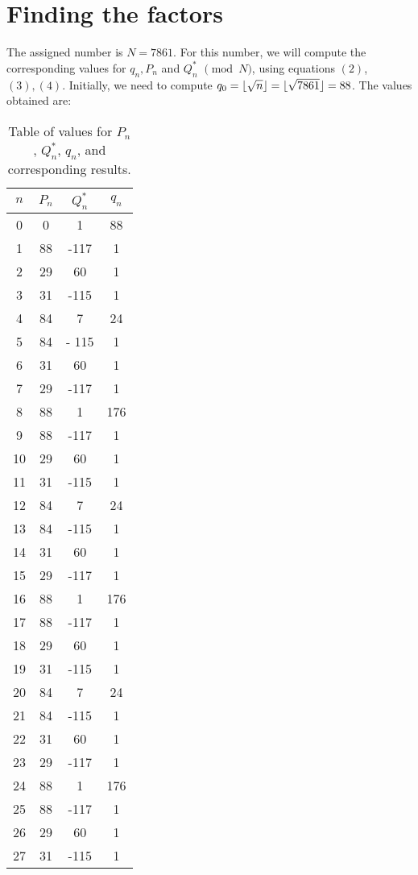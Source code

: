 \documentclass[12pt]{article}
\DeclarePairedDelimiter\floor{\lfloor}{\rfloor}
\theoremstyle{definition}
\begin{document}
\section{Finding the factors}
The assigned number is $N=7861$. For this number, we will compute the corresponding values for $q_n, P_n$ and $Q_n^*$ $\pmod N$, using equations $(2)$, $(3), (4)$. Initially, we need to compute $q_0 = \floor{\sqrt{n}} = \floor{\sqrt{7861}} = 88$. The values obtained are:
\begin{table}[h!]
    \centering
    \begin{tabular}{|c|c|c|c|}
        \hline
         \textbf{$n$} & \textbf{$P_n$} & \textbf{$Q_n^*$} & \textbf{$q_n$} \\
        \hline
         0  &  0  &  1  &  88  \\
         1  & 88  & -117 &  1   \\
         2  & 29  &  60 &  1   \\
         3  & 31  & -115 &  1   \\
         4  & 84  &   7 &  24  \\
         5  & 84  &- 115 &  1   \\
         6  & 31  &  60 &  1   \\
         7  & 29  & -117 &  1   \\
         8  & 88  &   1 & 176  \\
         9  & 88  & -117 &  1   \\
        10  & 29  &  60 &  1   \\
        11  & 31  & -115 &  1   \\
        12  & 84  &   7 &  24  \\
        13  & 84  & -115 &  1   \\
        14  & 31  &  60 &  1   \\
        15  & 29  & -117 &  1   \\
        16  & 88  &   1 & 176  \\
        17  & 88  & -117 &  1   \\
        18  & 29  &  60 &  1   \\
        19  & 31  & -115 &  1   \\
        20  & 84  &   7 &  24  \\
        21  & 84  & -115 &  1   \\
        22  & 31  &  60 &  1   \\
        23  & 29  & -117 &  1   \\
        24  & 88  &   1 & 176  \\
        25  & 88  & -117 &  1   \\
        26  & 29  &  60 &  1   \\
        27  & 31  & -115 &  1   \\
        \hline
    \end{tabular}
    \caption{Table of values for $P_n$, $Q_n^*$, $q_n$, and corresponding results.}
    \label{tab:values}
\end{table}
\end{document}
